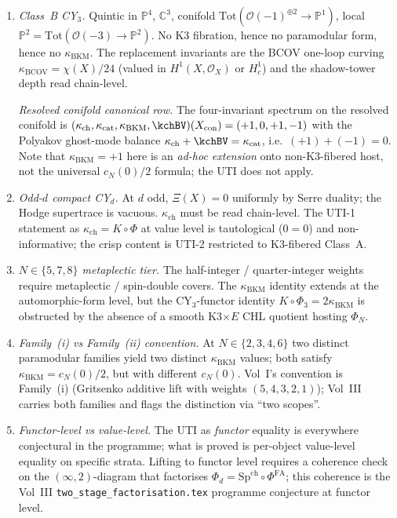 \documentclass[11pt]{article}
\theoremstyle{definition}
\newcommand{\kch}{\kappa_{\mathrm{ch}}}
\newcommand{\kcat}{\kappa_{\mathrm{cat}}}
\newcommand{\kBKM}{\kappa_{\mathrm{BKM}}}
\newcommand{\SpCh}{\mathrm{Sp}^{\mathrm{ch}}}
\newcommand{\PhiFA}{\Phi^{\mathrm{FA}}}
\begin{document}
\begin{enumerate}[(S1)]
\item \emph{Class~B CY$_3$.} Quintic in $\mathbb{P}^4$, $\mathbb{C}^3$,
conifold $\mathrm{Tot}(\mathcal{O}(-1)^{\oplus 2} \to \mathbb{P}^1)$,
local $\mathbb{P}^2 = \mathrm{Tot}(\mathcal{O}(-3) \to \mathbb{P}^2)$.
No K3 fibration, hence no paramodular form, hence no $\kBKM$. The
replacement invariants are the BCOV one-loop curving
$\kappa_{\mathrm{BCOV}} = \chi(X)/24$ (valued in $H^1(X, \mathcal{O}_X)$
or $H^1_c$) and the shadow-tower depth read chain-level.

\emph{Resolved conifold canonical row.} The four-invariant spectrum on
the resolved conifold is $(\kch, \kcat, \kBKM, \kchBV)
(X_{\mathrm{con}}) = (+1, 0, +1, -1)$ with the Polyakov ghost-mode
balance $\kch + \kchBV = \kcat$, i.e.\ $(+1) + (-1) = 0$. Note that
$\kBKM = +1$ here is an \emph{ad-hoc extension} onto non-K3-fibered
host, not the universal $c_N(0)/2$ formula; the UTI does not apply.

\item \emph{Odd-$d$ compact CY$_d$.} At $d$ odd, $\Xi(X) = 0$
uniformly by Serre duality; the Hodge supertrace is vacuous. $\kch$ must
be read chain-level. The UTI-1 statement as $\kch = K \circ \Phi$ at
value level is tautological ($0 = 0$) and non-informative; the crisp
content is UTI-2 restricted to K3-fibered Class~A.

\item \emph{$N \in \{5, 7, 8\}$ metaplectic tier.} The half-integer /
quarter-integer weights require metaplectic / spin-double covers. The
$\kBKM$ identity extends at the automorphic-form level, but the
CY$_3$-functor identity $K \circ \Phi_3 = 2 \kBKM$ is obstructed by the
absence of a smooth K3$\times E$ CHL quotient hosting $\Phi_N$.

\item \emph{Family~(i) vs Family~(ii) convention.} At $N \in \{2, 3, 4, 6\}$
two distinct paramodular families yield two distinct $\kBKM$ values;
both satisfy $\kBKM = c_N(0)/2$, but with different $c_N(0)$. Vol~I's
convention is Family~(i) (Gritsenko additive lift with weights
$(5, 4, 3, 2, 1)$); Vol~III carries both families and flags the
distinction via ``two scopes''.

\item \emph{Functor-level vs value-level.} The UTI as \emph{functor}
equality is everywhere conjectural in the programme; what is proved is
per-object value-level equality on specific strata. Lifting to functor
level requires a coherence check on the $(\infty, 2)$-diagram that
factorises $\Phi_d = \SpCh \circ \PhiFA$; this coherence is the Vol~III
\texttt{two\_stage\_factorisation.tex} programme conjecture at functor
level.
\end{enumerate}
\end{document}
